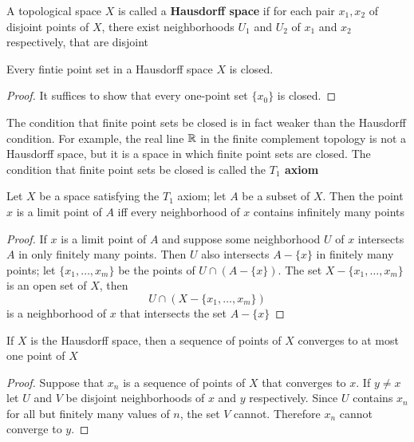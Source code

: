\documentclass[11pt]{article}
\begin{document}
\begin{definition}[]
A topological space \(X\) is called a \textbf{Hausdorff space} if for each pair \(x_1,x_2\) of disjoint
points of \(X\), there exist neighborhoods \(U_1\) and \(U_2\) of \(x_1\) and \(x_2\) respectively,
that are disjoint
\end{definition}

\begin{theorem}[]
Every fintie point set in a Hausdorff space \(X\) is closed.
\end{theorem}

\begin{proof}
It suffices to show that every one-point set \(\{x_0\}\) is closed.
\end{proof}

The condition that finite point sets be closed is in fact weaker than the Hausdorff condition.
For example, the real line \(\mathbb{R}\) in the finite complement topology is not a Hausdorff space, but
it is a space in which finite point sets are closed. The condition that finite point sets be
closed is called the \textbf{\(T_1\) axiom}

\begin{theorem}[]
Let \(X\) be a space satisfying the \(T_1\) axiom; let \(A\) be a subset of \(X\). Then the
point \(x\) is a limit point of \(A\) iff every neighborhood of \(x\) contains infinitely many points
\end{theorem}

\begin{proof}
If \(x\) is a limit point of \(A\) and suppose some neighborhood \(U\) of \(x\) intersects \(A\)
in only finitely many points. Then \(U\) also intersects \(A-\{x\}\) in finitely many points;
let \(\{x_1,\dots,x_m\}\) be the points of \(U\cap(A-\{x\})\). The set \(X-\{x_1,\dots,x_m\}\) is an open set
of \(X\), then
\begin{equation*}
U\cap(X-\{x_1,\dots,x_m\})
\end{equation*}
is a neighborhood of \(x\) that intersects the set \(A-\{x\}\)
\end{proof}

\begin{theorem}[]
If \(X\) is the Hausdorff space, then a sequence of points of \(X\) converges to at most one
point of \(X\)
\end{theorem}

\begin{proof}
Suppose that \(x_n\) is a sequence of points of \(X\) that converges to \(x\). If \(y\neq x\)
let \(U\) and \(V\) be disjoint neighborhoods of \(x\) and \(y\) respectively. Since \(U\)
contains \(x_n\) for all but finitely many values of \(n\), the set \(V\) cannot.
Therefore \(x_n\) cannot converge to \(y\).
\end{proof}
\end{document}
